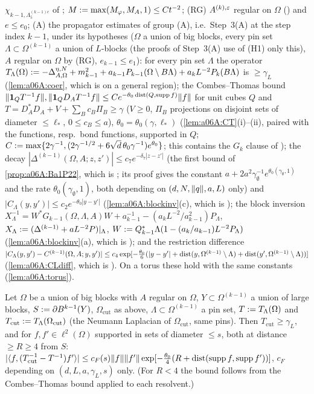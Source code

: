 $\chi_{k-1,\Lambda^{(k-1)c}_5}$ of \cite[(2.45)--(2.46)]{Ba2}; $M:=\max(M_\varphi,M_A,1)\le Ct^{-2}$; (RG) $A^{(k),\varepsilon}$ regular on $\Omega$ (\cite[p.~562, (2.98)]{Ba2}) and $e\le e_0$; (A) the propagator estimates of group (A), i.e.\ Step~3(A) at the step index $k-1$, under its hypotheses ($\Omega$ a union of big blocks, every pin set $\Lambda\subset\Omega^{(k-1)}$ a union of $L$-blocks (the proofs of Step~3(A) use of (H1) only this), $A$ regular on $\Omega$ by (RG), $e_{k-1}\le e_1$): for every pin set $\Lambda$ the operator $T_\Lambda(\Omega):=-\Delta^{\eta,N}_{A,\Omega}+m^2_{k-1}+a_{k-1}P_{k-1}(\Omega\setminus B\Lambda)+a_kL^{-2}P_k(B\Lambda)$ is $\ge\gamma_L$ (\cref{lem:a06A:coer}, which is \cite[(1.8)]{Ba4} on a general region); the Combes--Thomas bound $\lVert \mathbf 1_QT^{-1}f\rVert,\lVert \mathbf 1_QD_AT^{-1}f\rVert\le Ce^{-\theta_0\operatorname{dist}(Q,\operatorname{supp} f)}\lVert f\rVert$ for unit cubes $Q$ and $T=D_A^*D_A+V+\sum_Bc_B\Pi_B\ge\gamma$ ($V\ge0$, $\Pi_B$ projections on disjoint sets of diameter $\le\ell_*$, $0\le c_B\le a$), $\theta_0=\theta_0(\gamma,\ell_*)$ (\cref{lem:a06A:CT}(i)--(ii), paired with the functions, resp.\ bond functions, supported in $Q$; $C:=\max\{2\gamma^{-1},(2\gamma^{-1/2}+6\sqrt d\,\theta_0\gamma^{-1})e^{\theta_0}\}$; this contains the $G_k$ clause of \cite[Cor.~2.3]{Ba4}); the decay $|\Delta^{(k-1)}(\Omega,A;z,z')|\le c_7e^{-\delta_7|z-z'|}$ (the first bound of \cref{prop:a06A:Ba1P22}, which is \cite[(2.27)]{Ba1}; its proof gives the constant $a+2a^2\gamma_\emptyset^{-1}e^{\theta_0(\gamma_\emptyset,1)}$ and the rate $\theta_0(\gamma_\emptyset,1)$, both depending on $(d,N,\lVert q\rVert,a,L)$ only) and $|C_\Lambda(y,y')|\le c_2e^{-\theta_0|y-y'|}$ (\cref{lem:a06A:blockinv}(c), which is \cite[(1.16)]{Ba4}); the block inversion $X_\Lambda^{-1}=W^*G_{k-1}(\Omega,\Lambda,A)W+a_{k-1}^{-1}-(a_kL^{-2}/a_{k-1}^2)P_\Lambda$, $X_\Lambda:=(\Delta^{(k-1)}+aL^{-2}P)|_\Lambda$, $W:= Q_{k-1}^*\Lambda(1-(a_k/a_{k-1})L^{-2}P_\Lambda)$ (\cref{lem:a06A:blockinv}(a), which is \cite[(3.8)]{Ba4}); and the restriction difference $|C_\Lambda(y,y')-C^{(k-1)}(\Omega,A;y,y')|\le c_4\exp[-\frac{\theta_0}6(|y-y'|+\operatorname{dist}(y,\Omega^{(k-1)}\setminus\Lambda)+\operatorname{dist}(y',\Omega^{(k-1)}\setminus\Lambda))]$ (\cref{lem:a06A:CLdiff}, which is \cite[(1.18)]{Ba4}). On a torus these hold with the same constants (\cref{lem:a06A:torus}).

\begin{lemma}\label{lem:a06f:F1}
Let $\Omega$ be a union of big blocks with $A$ regular on $\Omega$, $Y\subset\Omega^{(k-1)}$ a union of large blocks, $S:=\partial B^{k-1}(Y)$, $\Omega_{\mathrm{cut}}$ as above, $\Lambda\subset\Omega^{(k-1)}$ a pin set, $T:= T_\Lambda(\Omega)$ and $T_{\mathrm{cut}}:= T_\Lambda(\Omega_{\mathrm{cut}})$ (the Neumann Laplacian of $\Omega_{\mathrm{cut}}$, same pins). Then $T_{\mathrm{cut}}\ge\gamma_L$, and for $f,f'\in\ell^2(\Omega)$ supported in sets of diameter $\le s$, both at distance $\ge R\ge4$ from $S$: $|\langle f,(T_{\mathrm{cut}}^{-1}-T^{-1})f'\rangle|\le c_F(s)\lVert f\rVert\lVert f'\rVert\exp[-\frac{\theta_0}4(R+\operatorname{dist}(\operatorname{supp} f,\operatorname{supp} f'))]$, $c_F$ depending on $(d,L,a,\gamma_L,s)$ only. (For $R<4$ the bound follows from the Combes--Thomas bound applied to each resolvent.)
\end{lemma}

